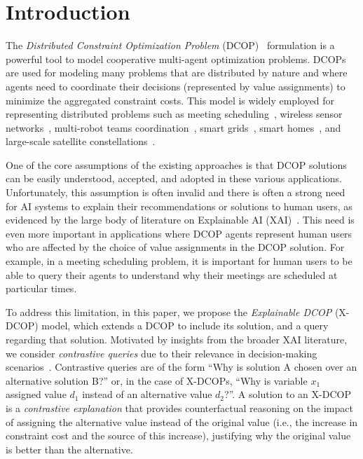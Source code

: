 \documentclass[twoside,11pt]{article}
\begin{document}
\section{Introduction}


The \emph{Distributed Constraint Optimization Problem} (DCOP)~\cite{modi:05,petcu:05,fioretto:18} formulation is a powerful tool to model cooperative multi-agent optimization problems. DCOPs are used for modeling many problems that are distributed by nature and where agents need to coordinate their decisions (represented by value assignments) to minimize the aggregated constraint costs. This model is widely employed 
for representing distributed problems such as meeting scheduling~\cite{maheswaran:04a}, wireless sensor networks~\cite{yeoh:10}, multi-robot teams coordination~\cite{zivan:15,pertzovskiy2023cams}, smart grids~\cite{miller:12}, smart homes~\cite{fioretto:17a,rust2022resilient}, and large-scale satellite constellations~\cite{ZilbersteinRSC24}.

One of the core assumptions of the existing approaches is that DCOP solutions can be easily understood, accepted, and adopted in these various applications. Unfortunately, this assumption is often invalid and there is often a strong need for AI systems to explain their recommendations or solutions to human users, as evidenced by the large body of literature on Explainable AI (XAI)~\cite{gunning2019xai,Miller2019,ttathai2020,byrne2023good}. This need is even more important in applications where DCOP agents represent human users who are affected by the choice of value assignments in the DCOP solution. For example, in a meeting scheduling problem, it is important for human users to be able to query their agents to understand why their meetings are scheduled at particular times. 

To address this limitation, in this paper, we propose the \emph{Explainable DCOP} (X-DCOP) model, which extends a DCOP to include its solution, and a query regarding that solution. Motivated by insights from the broader XAI literature, we consider \emph{contrastive queries} due to their relevance in decision-making scenarios~\cite{krarup2021contrastive,vasileioua2023lasp,zehtabi2024contrastive}. Contrastive queries are of the form ``Why is solution A chosen over an alternative solution B?'' or, in the case of X-DCOPs, ``Why is variable $x_1$ assigned value $d_1$ instead of an alternative value $d_2$?''. A solution to an X-DCOP is a \emph{contrastive explanation} that provides counterfactual reasoning on the impact of assigning the alternative value instead of the original value (i.e., the increase in constraint cost and the source of this increase), justifying why the original value is better than the alternative. 
\end{document}
